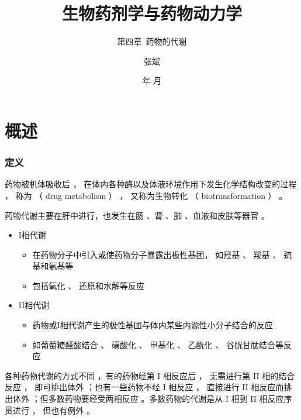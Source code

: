 \documentclass[dvipsnames, svgnames, x11names]{beamer}
\title{生物药剂学与药物动力学}
\subtitle{第四章\ 药物的代谢}
\author{张斌}
\institute[理工系]{河北农业大学 理工系}
\date{\the\year 年 \the\month 月}
\begin{document}
	
\maketitle


\begin{frame}{}
	\begin{center}
		{\Huge {}}
	\end{center}
	\tableofcontents[subsectionstyle=hide/hide/show]
	\thispagestyle{empty}
	\addtocounter{framenumber}{-1}
\end{frame}


\section{概述}


\begin{frame}
    \frametitle{定义}
    药物被机体吸收后 ， 在体内各种酶以及体液环境作用下发生化学结构改变的过程 ， 称为 （ drug metabolism ） ， 又称为生物转化 （ biotransformation ） 。 
    
    药物代谢主要在肝中进行，也发生在肠 、肾 、肺 、血液和皮肤等器官 。

    \begin{itemize}
      \item I相代谢
        \begin{itemize}
          \item 在药物分子中引入或使药物分子暴露出极性基团， 如羟基 、 羧基 、 巯基和氨基等
          \item 包括氧化 、 还原和水解等反应
        \end{itemize}
      \item II相代谢
        \begin{itemize}
          \item 药物或I相代谢产生的极性基团与体内某些内源性小分子结合的反应
          \item 如葡萄糖醛酸结合 、 磺酸化 、 甲基化 、 乙酰化 、 谷胱甘肽结合等反应
        \end{itemize}
    \end{itemize}
    各种药物代谢的方式不同 ，有的药物经第 I 相反应后 ， 无需进行第 II 相的结合反应 ， 即可排出体外 ；也有一些药物不经 I 相反应 ， 直接进行 II 相反应而排出体外 ；但多数药物要经受两相反应 。多数药物的代谢是从 I 相到 II 相反应序贯进行 ， 但也有例外 。 

    
\end{frame}
\end{document}
